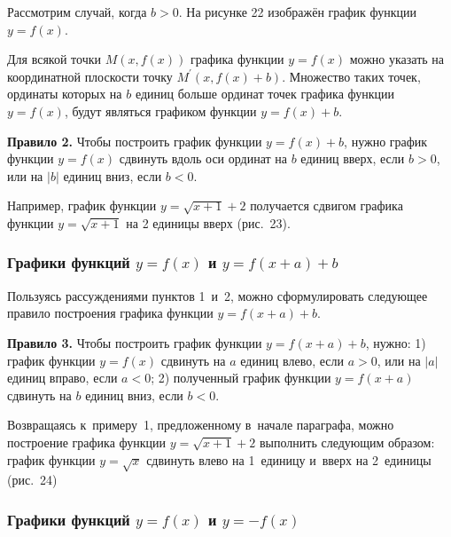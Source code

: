 Рассмотрим случай, когда $b > 0$.
На рисунке 22 изображён график функции $y = f(x)$.

\begin{figure}
\end{figure}

Для всякой точки $M(x, f(x))$ графика функции $y = f(x)$ можно указать
на координатной плоскости точку $M^{\prime}(x, f(x) + b)$.
Множество таких точек, ординаты которых на $b$ единиц больше ординат
точек графика функции $y = f(x)$, будут являться графиком функции
$y = f(x) + b$.

\textbf{Правило 2.} Чтобы построить график функции $y = f(x) + b$,
нужно график функции $y = f(x)$ сдвинуть вдоль оси ординат на $b$
единиц вверх, если $b > 0$, или на $|b|$ единиц вниз, если $b < 0$.

Например, график функции $y = \sqrt{x + 1} + 2$ получается сдвигом
графика функции $y = \sqrt{x + 1}$ на 2 единицы вверх (рис.\ 23).

\begin{figure}
\end{figure}


\subsubsection{Графики функций $y = f(x)$ и $y = f(x+a) + b$}

Пользуясь рассуждениями пунктов 1~и~2, можно сформулировать следующее правило
построения графика функции $y = f(x+a) + b$.

\textbf{Правило 3.} Чтобы построить график функции $y = f(x+a) + b$,
нужно:
1) график функции $y = f(x)$ сдвинуть на $a$ единиц влево,
если $a > 0$, или на $|a|$ единиц вправо, если $a < 0$;
2) полученный график функции $y = f(x+a)$ сдвинуть на $b$ единиц
вниз, если $b < 0$.

Возвращаясь к~примеру~1, предложенному в~начале параграфа,
можно построение графика функции $y = \sqrt{x + 1} + 2$
выполнить следующим образом: график функции $y = \sqrt{x}$ 
сдвинуть влево на 1~единицу и~вверх на 2~единицы (рис.\ 24)

\begin{figure}
\end{figure}


\subsubsection{Графики функций $y = f(x)$ и $y = -f(x)$}

